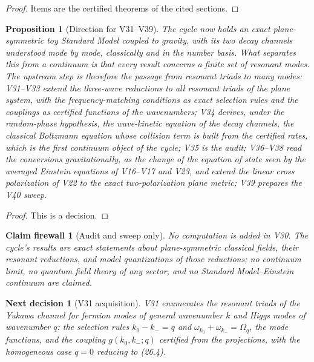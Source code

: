\documentclass[11pt]{article}
\newtheorem{proposition}[theorem]{Proposition}
\newtheorem{firewall}[theorem]{Claim firewall}
\newtheorem{decision}[theorem]{Next decision}
\theoremstyle{remark}
\begin{document}
\begin{proof}
Items are the certified theorems of the cited sections.
\end{proof}

\begin{proposition}[Direction for V31--V39]
\label{prop:v20v30-direction}
The cycle now holds an exact plane-symmetric toy Standard Model
coupled to gravity, with its two decay channels understood mode by
mode, classically and in the number basis.  What separates this from
a continuum is that every result concerns a finite set of resonant
modes.  The upstream step is therefore the passage from resonant
triads to many modes: V31--V33 extend the three-wave reductions to
all resonant triads of the plane system, with the frequency-matching
conditions as exact selection rules and the couplings as certified
functions of the wavenumbers; V34 derives, under the random-phase
hypothesis, the wave-kinetic equation of the decay channels, the
classical Boltzmann equation whose collision term is built from the
certified rates, which is the first continuum object of the cycle;
V35 is the audit; V36--V38 read the conversions gravitationally, as
the change of the equation of state seen by the averaged Einstein
equations of V16--V17 and V23, and extend the linear cross
polarization of V22 to the exact two-polarization plane metric; V39
prepares the V40 sweep.
\end{proposition}

\begin{proof}
This is a decision.
\end{proof}

\begin{firewall}[Audit and sweep only]
\label{fire:v20v30}
No computation is added in V30.  The cycle's results are exact
statements about plane-symmetric classical fields, their resonant
reductions, and model quantizations of those reductions; no
continuum limit, no quantum field theory of any sector, and no
Standard Model--Einstein continuum are claimed.
\end{firewall}

\begin{decision}[V31 acquisition]
\label{dec:v20v30-next}
V31 enumerates the resonant triads of the Yukawa channel for
fermion modes of general wavenumber \(k\) and Higgs modes of
wavenumber \(q\): the selection rules \(k_0-k_-=q\) and
\(\omega_{k_0}+\omega_{k_-}=\Omega_q\), the mode functions, and the
coupling \(g(k_0,k_-;q)\) certified from the projections, with the
homogeneous case \(q=0\) reducing to (26.4).
\end{decision}
\end{document}
